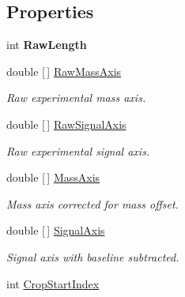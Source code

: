 \subsection*{Properties}
\begin{DoxyCompactItemize}
\item 
\mbox{\label{class_isotope_fit_1_1_i_f_data_1_1_spectrum_ae22a343962081fb1b7191f3df3634b00}} 
int {\bfseries Raw\+Length}
\item 
double \mbox{[}$\,$\mbox{]} \hyperlink{class_isotope_fit_1_1_i_f_data_1_1_spectrum_ac3297615e23a978626e4beaf9e040e2a}{Raw\+Mass\+Axis}
\begin{DoxyCompactList}\small\item\em Raw experimental mass axis. \end{DoxyCompactList}\item 
double \mbox{[}$\,$\mbox{]} \hyperlink{class_isotope_fit_1_1_i_f_data_1_1_spectrum_a948927d795db6a73eb1ddeac4f294cac}{Raw\+Signal\+Axis}
\begin{DoxyCompactList}\small\item\em Raw experimental signal axis. \end{DoxyCompactList}\item 
double \mbox{[}$\,$\mbox{]} \hyperlink{class_isotope_fit_1_1_i_f_data_1_1_spectrum_a4ed9378cb593bfffacaa3ac4411c039d}{Mass\+Axis}
\begin{DoxyCompactList}\small\item\em Mass axis corrected for mass offset. \end{DoxyCompactList}\item 
double \mbox{[}$\,$\mbox{]} \hyperlink{class_isotope_fit_1_1_i_f_data_1_1_spectrum_a561e2e683aee78aed97a967a68b474e9}{Signal\+Axis}
\begin{DoxyCompactList}\small\item\em Signal axis with baseline subtracted. \end{DoxyCompactList}\item 
int \hyperlink{class_isotope_fit_1_1_i_f_data_1_1_spectrum_a97f98d7ab017cc965f004c02da75c791}{Crop\+Start\+Index}

\end{DoxyCompactItemize}

